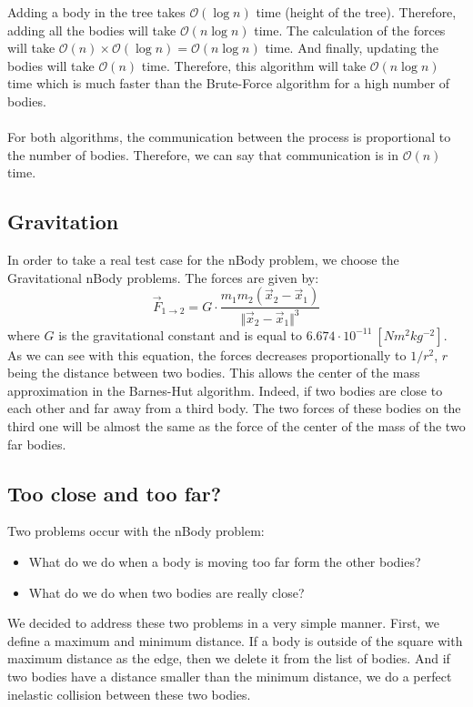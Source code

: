 \documentclass[11pt,a4paper]{article}
\begin{document}
Adding a body in the tree takes $\mathcal{O}(\log n)$ time (height of the tree). Therefore, adding all the bodies will take $\mathcal{O}(n\log n)$ time. The calculation of the forces will take $\mathcal{O}(n) \times \mathcal{O}(\log n) = \mathcal{O}(n\log n)$ time. And finally, updating the bodies will take $\mathcal{O}(n)$ time. Therefore, this algorithm will take $\mathcal{O}(n\log n)$ time which is much faster than the Brute-Force algorithm for a high number of bodies.
\\\\
For both algorithms, the communication between the process is proportional to the number of bodies. Therefore, we can say that communication is in $\mathcal{O}(n)$ time.

\subsection{Gravitation} 

In order to take a real test case for the nBody problem, we choose the Gravitational nBody problems. The forces are given by:
\begin{equation}
\vec{F}_{1\rightarrow 2} = G\cdot\frac{m_1m_2(\vec{x}_2-\vec{x}_1)}{\Vert \vec{x}_2-\vec{x}_1\Vert^3}
\end{equation}
where $G$ is the gravitational constant and is equal to $6.674 \cdot 10^{-11}~[Nm^2kg^{-2}]$. As we can see with this equation, the forces decreases proportionally to $1/r^2$, $r$ being the distance between two bodies. This allows the center of the mass approximation in the Barnes-Hut algorithm. Indeed, if two bodies are close to each other and far away from a third body. The two forces of these bodies on the third one will be almost the same as the force of the center of the mass of the two far bodies.

\subsection{Too close and too far?} 
Two problems occur with the nBody problem:
\begin{itemize}
\item What do we do when a body is moving too far form the other bodies?
\item What do we do when two bodies are really close? 
\end{itemize} 

We decided to address these two problems in a very simple manner. First, we define a maximum and minimum distance. If a body is outside of the square with maximum distance as the edge, then we delete it from the list of bodies. And if two bodies have a distance smaller than the minimum distance, we do a perfect inelastic collision between these two bodies.
\end{document}
